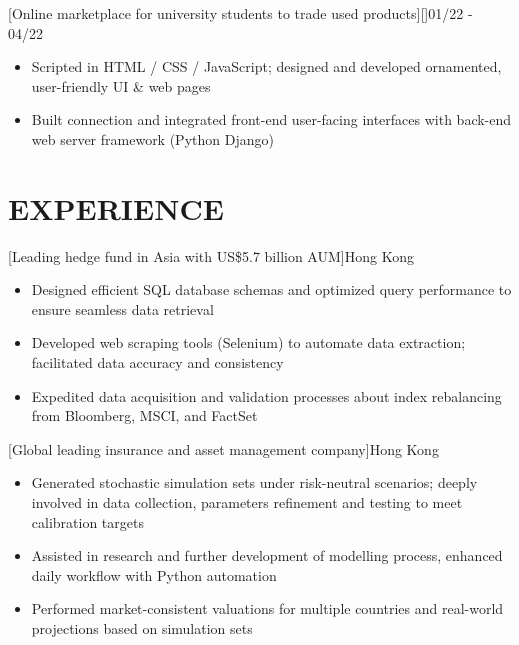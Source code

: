 \documentclass[cmu]{resume}
\begin{document}
    [Online marketplace for university students to trade used products][]{01/22 - 04/22}
    \begin{itemize}
        \item Scripted in HTML / CSS / JavaScript; designed and developed ornamented, user-friendly UI \& web pages
        \item Built connection and integrated front-end user-facing interfaces with back-end web server framework (Python Django)
    \end{itemize}
    \section{EXPERIENCE}
    [Leading hedge fund in Asia with US\$5.7 billion AUM]{Hong Kong}
    \begin{itemize}
        \item Designed efficient SQL database schemas and optimized query performance to ensure seamless data retrieval
        \item Developed web scraping tools (Selenium) to automate data extraction; facilitated data accuracy and consistency
        \item Expedited data acquisition and validation processes about index rebalancing from Bloomberg, MSCI, and FactSet
    \end{itemize}

    [Global leading insurance and asset management company]{Hong Kong}
    \begin{itemize}
        \item Generated stochastic simulation sets under risk-neutral scenarios; deeply involved in data collection, parameters refinement and testing to meet calibration targets
        \item Assisted in research and further development of modelling process, enhanced daily workflow with Python automation
        \item Performed market-consistent valuations for multiple countries and real-world projections based on simulation sets
    \end{itemize}
\end{document}

